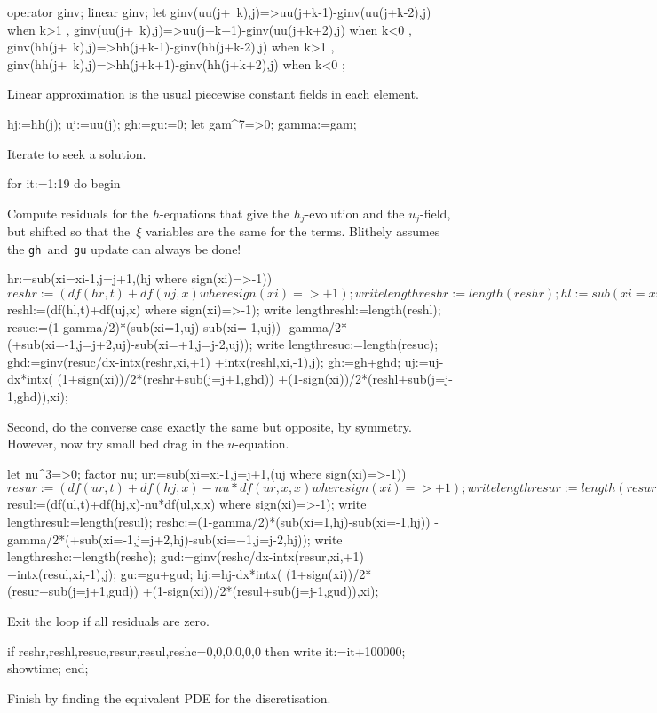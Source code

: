 \documentclass[10pt,a5paper]{article}
\begin{document}
\begin{reduce}
operator ginv; linear ginv;
let { ginv(uu(j+~k),j)=>uu(j+k-1)-ginv(uu(j+k-2),j) when k>1
    , ginv(uu(j+~k),j)=>uu(j+k+1)-ginv(uu(j+k+2),j) when k<0
    , ginv(hh(j+~k),j)=>hh(j+k-1)-ginv(hh(j+k-2),j) when k>1
    , ginv(hh(j+~k),j)=>hh(j+k+1)-ginv(hh(j+k+2),j) when k<0
    };
\end{reduce}
Linear approximation is the usual piecewise constant fields in each element.
\begin{reduce}
hj:=hh(j); uj:=uu(j);
gh:=gu:=0;
let gam^7=>0;
gamma:=gam;
\end{reduce}
Iterate to seek a solution.
\begin{reduce}
for it:=1:19 do begin
\end{reduce}
Compute residuals for the $h$-equations that give the $h_j$-evolution and the $u_j$-field, but shifted so that the~$\xi$
variables are the same for the terms.  Blithely assumes the \verb|gh|~and~\verb|gu| update can always be done!
\begin{reduce}
hr:=sub({xi=xi-1,j=j+1},(hj where sign(xi)=>-1))$
reshr:=(df(hr,t)+df(uj,x) where sign(xi)=>+1);
write lengthreshr:=length(reshr);
hl:=sub({xi=xi+1,j=j-1},(hj  where sign(xi)=>+1))$
reshl:=(df(hl,t)+df(uj,x) where sign(xi)=>-1);
write lengthreshl:=length(reshl);
resuc:=(1-gamma/2)*(sub(xi=1,uj)-sub(xi=-1,uj))
         -gamma/2*(+sub({xi=-1,j=j+2},uj)-sub({xi=+1,j=j-2},uj));
write lengthresuc:=length(resuc);
ghd:=ginv(resuc/dx-intx(reshr,xi,+1)
                  +intx(reshl,xi,-1),j);
gh:=gh+ghd;
uj:=uj-dx*intx( (1+sign(xi))/2*(reshr+sub(j=j+1,ghd))
               +(1-sign(xi))/2*(reshl+sub(j=j-1,ghd)),xi);
\end{reduce}
Second, do the converse case exactly the same but opposite, by symmetry.  However, now try small bed drag in the $u$-equation.
\begin{reduce}
let nu^3=>0;  factor nu;
ur:=sub({xi=xi-1,j=j+1},(uj where sign(xi)=>-1))$
resur:=(df(ur,t)+df(hj,x)-nu*df(ur,x,x) where sign(xi)=>+1);
write lengthresur:=length(resur);
ul:=sub({xi=xi+1,j=j-1},(uj where sign(xi)=>+1))$
resul:=(df(ul,t)+df(hj,x)-nu*df(ul,x,x) where sign(xi)=>-1);
write lengthresul:=length(resul);
reshc:=(1-gamma/2)*(sub(xi=1,hj)-sub(xi=-1,hj))
         -gamma/2*(+sub({xi=-1,j=j+2},hj)-sub({xi=+1,j=j-2},hj));
write lengthreshc:=length(reshc);
gud:=ginv(reshc/dx-intx(resur,xi,+1)
                  +intx(resul,xi,-1),j);
gu:=gu+gud;
hj:=hj-dx*intx( (1+sign(xi))/2*(resur+sub(j=j+1,gud))
               +(1-sign(xi))/2*(resul+sub(j=j-1,gud)),xi);
\end{reduce}
Exit the loop if all residuals are zero.
\begin{reduce}
  if {reshr,reshl,resuc,resur,resul,reshc}={0,0,0,0,0,0}
  then write it:=it+100000;
  showtime;
end;
\end{reduce}
Finish by finding the equivalent PDE for the discretisation.
\end{document}
